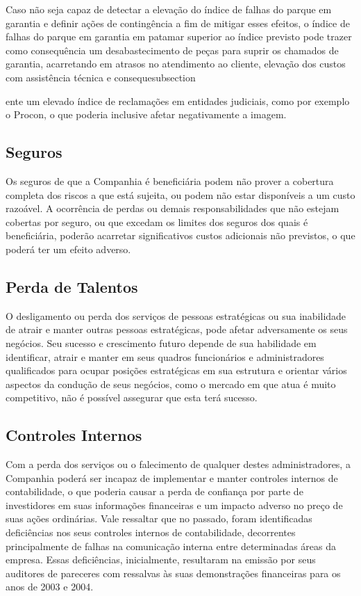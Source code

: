 {{Caso não seja capaz de detectar a elevação do índice de falhas do parque em garantia e definir ações de contingência a fim de mitigar esses efeitos, o índice de falhas do parque em garantia em patamar superior ao índice previsto pode trazer como consequência um desabastecimento de peças para suprir os chamados de garantia, acarretando em atrasos no atendimento ao cliente, elevação dos custos com assistência técnica e consequesubsection{ente um elevado índice de reclamações em entidades judiciais, como por exemplo o Procon, o que poderia inclusive afetar negativamente a imagem.

\subsection{Seguros} 
Os seguros de que a Companhia é beneficiária podem não prover a cobertura completa dos riscos a que está sujeita, ou podem não estar disponíveis a um custo razoável. A ocorrência de perdas ou demais responsabilidades que não estejam cobertas por seguro, ou que excedam os limites dos seguros dos quais é beneficiária, poderão acarretar significativos custos adicionais não previstos, o que poderá ter um efeito adverso.

\subsection{Perda de Talentos}
O desligamento ou perda dos serviços de pessoas estratégicas ou sua inabilidade de atrair e manter outras pessoas estratégicas, pode afetar adversamente os seus negócios. Seu sucesso e crescimento futuro depende de sua habilidade em identificar, atrair e manter em seus quadros funcionários e administradores qualificados para ocupar posições estratégicas em sua estrutura e orientar vários aspectos da condução de seus negócios, como o mercado em que atua é muito competitivo, não é possível assegurar que esta terá sucesso.

\subsection{Controles Internos}
Com a perda dos serviços ou o falecimento de qualquer destes administradores, a Companhia poderá ser incapaz de implementar e manter controles internos de contabilidade, o que poderia causar a perda de confiança por parte de investidores em suas informações financeiras e um impacto adverso no preço de suas ações ordinárias. Vale ressaltar que no passado, foram identificadas deficiências nos seus controles internos de contabilidade, decorrentes principalmente de falhas na comunicação interna entre determinadas áreas da empresa. Essas deficiências, inicialmente, resultaram na emissão por seus auditores de pareceres com ressalvas às suas demonstrações financeiras para os anos de 2003 e 2004. 

}}}
